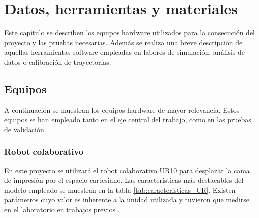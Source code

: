 \chapter{Datos, herramientas y materiales}
Este capítulo se describen los equipos hardware utilizados para la consecución del proyecto y las pruebas necesarias. Además se realiza una breve descripción de aquellas herramientas software empleadas en labores de simulación, análisis de datos o calibración de trayectorias.

 \section{Equipos}
A continuación se muestran los equipos hardware de mayor relevancia. Estos equipos se han empleado tanto en el eje central del trabajo, como en las pruebas de validación.

\subsection{Robot colaborativo}
En este proyecto se utilizará el robot colaborativo UR10 para desplazar la cama de impresión por el espacio cartesiano. Las características más destacables del modelo empleado se muestran en la tabla \ref{tab:caracteristicas_UR}. Existen parámetros cuyo valor es inherente a la unidad utilizada y tuvieron que medirse en el laboratorio en trabajos previos \cite{TFM_SanchoAmparo}.

